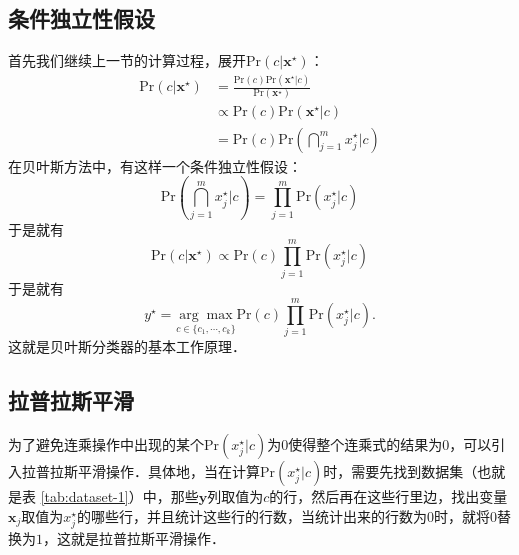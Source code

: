 \documentclass{ctexart}
\newcommand{\pr}{\mathrm{Pr}}
\begin{document}
    \subsection{条件独立性假设}
    首先我们继续上一节的计算过程，展开$\pr(c|\boldsymbol{x}^\star)$：
    \begin{align}
        \pr(c|\boldsymbol{x}^\star) &= \frac{\pr(c) \pr(\boldsymbol{x}^\star | c)}{\pr(\boldsymbol{x}^\star)} \\
        &\propto \pr(c) \pr(\boldsymbol{x}^\star | c) \\
        &= \pr(c)\pr(\bigcap_{j=1}^{m}x_{j}^\star|c)
    \end{align}
    在贝叶斯方法中，有这样一个条件独立性假设：
    \begin{equation}
        \pr(\bigcap_{j=1}^{m} x_{j}^\star|c) = \prod_{j=1}^m \pr(x_{j}^\star|c)
    \end{equation}
    于是就有
    \begin{equation}
        \pr(c|\boldsymbol{x}^\star) \propto \pr(c) \prod_{j=1}^{m} \pr(x_{j}^\star | c)
    \end{equation}
    于是就有
    \begin{equation}
        y^\star = \underset{c \in \{c_1,\cdots,c_k\}}{\arg\max} \pr(c) \prod_{j=1}^{m} \pr(x_{j}^\star | c).
    \end{equation}
    这就是贝叶斯分类器的基本工作原理．

    \subsection{拉普拉斯平滑}
    为了避免连乘操作中出现的某个$\pr(x_j^\star|c)$为$0$使得整个连乘式的结果为$0$，可以引入拉普拉斯平滑操作．具体地，当在计算$\pr(x_j^\star|c)$时，需要先找到数据集（也就是表 \ref{tab:dataset-1}）中，那些$\boldsymbol{y}$列取值为$c$的行，然后再在这些行里边，找出变量$\boldsymbol{x}_j$取值为$x_j^\star$的哪些行，并且统计这些行的行数，当统计出来的行数为$0$时，就将$0$替换为$1$，这就是拉普拉斯平滑操作．
\end{document}
